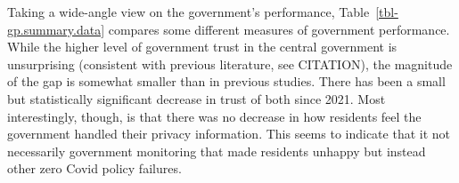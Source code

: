 \documentclass[
  letterpaper,
  DIV=11,
  numbers=noendperiod]{scrartcl}
\begin{document}
Taking a wide-angle view on the government's performance,
Table~\ref{tbl-gp.summary.data} compares some different measures of
government performance. While the higher level of government trust in
the central government is unsurprising (consistent with previous
literature, see CITATION), the magnitude of the gap is somewhat smaller
than in previous studies. There has been a small but statistically
significant decrease in trust of both since 2021. Most interestingly,
though, is that there was no decrease in how residents feel the
government handled their privacy information. This seems to indicate
that it not necessarily government monitoring that made residents
unhappy but instead other zero Covid policy failures.

\hypertarget{tbl-gp.q.text}{}
\begin{table}
\caption{\label{tbl-gp.q.text}Government performance questions }\tabularnewline

\centering
{}
\end{table}
\end{document}
